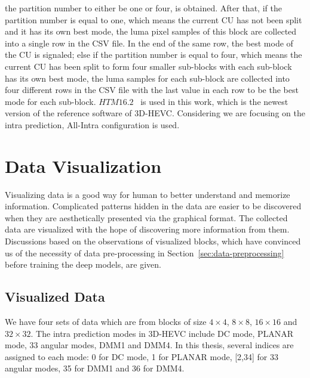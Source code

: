 the partition number to either be one or four, is obtained.
After that, 
if the partition number is equal to one, which means the current CU has not
been split and it has its own best mode, 
the luma pixel samples of this block are collected into a single row in the
CSV file.
In the end of the same row, the best mode of the CU is signaled;
else if the partition number is equal to four, which means the current CU has been
split to form four smaller sub-blocks with each sub-block has its
own best mode, the luma samples for each sub-block are collected into 
four different rows
in the CSV file with the last value in each row to be the best mode for each
sub-block.
\(HTM16.2\)~\parencite{RN214} is used in this work, which is the newest
version of the reference software of 3D-HEVC\@.
Considering we are focusing on the intra prediction,
All-Intra configuration is used.

\section{Data Visualization}\label{sec:data-visu}
Visualizing data is a good way for human to better understand
and memorize information. 
Complicated patterns hidden in the data are easier to be discovered when they 
are aesthetically presented via the graphical format.
The collected data are visualized with the hope of
discovering more information from them.
Discussions based on the observations of visualized blocks,
which have convinced us of the necessity of data 
pre-processing in Section~\ref{sec:data-preprocessing} before 
training the deep models, are given.

\subsection{Visualized Data}\label{subsec:see-data-visu}
We have four sets of data which are from blocks of size
\(4\times4\), \(8\times8\), \(16\times16\) and \(32\times32\).
The intra prediction modes in 3D-HEVC include
DC mode, PLANAR mode, 33 angular modes, DMM1 and DMM4.
In this thesis, several indices are assigned to each mode:
0 for DC mode, 1 for PLANAR mode, {[2,34]} for 33 angular modes, 35
for DMM1 and 36 for DMM4.

